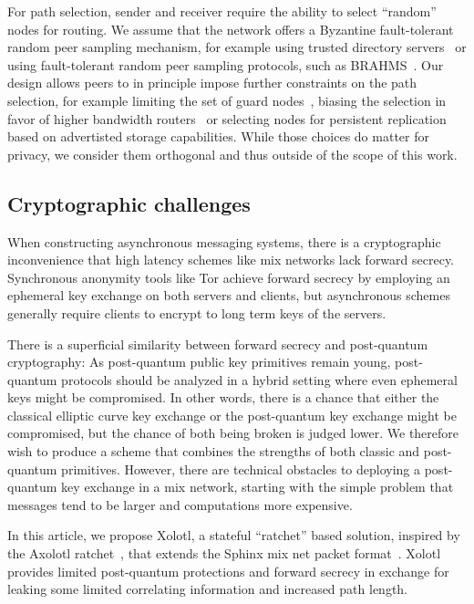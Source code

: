 \documentclass[twoside,letterpaper]{llncs}
\begin{document}
For path selection, sender and receiver require the ability to select
``random'' nodes for routing.  We assume that the network offers a
Byzantine fault-tolerant random peer sampling mechanism, for example
using trusted directory servers~\cite{tordir} or using fault-tolerant
random peer sampling protocols, such as BRAHMS~\cite{brahms}.  Our
design allows peers to in principle impose further constraints on the
path selection, for example limiting the set of guard
nodes~\cite{oneguardisenough}, biasing the selection in favor of
higher bandwidth routers~\cite{findexample} or selecting nodes for
persistent replication based on advertisted storage capabilities.
While those choices do matter for privacy, we consider them orthogonal
and thus outside of the scope of this work.

\subsection{Cryptographic challenges}

When constructing asynchronous messaging systems, there is a
cryptographic inconvenience that high latency schemes like mix
networks lack forward secrecy.  Synchronous anonymity tools like Tor
achieve forward secrecy by employing an ephemeral key exchange on both
servers and clients, but asynchronous schemes generally require
clients to encrypt to long term keys of the servers.

There is a superficial similarity between forward secrecy and
post-quantum cryptography: As post-quantum public key primitives
remain young, post-quantum protocols should be analyzed in a hybrid
setting where even ephemeral keys might be compromised.  In other
words, there is a chance that either the classical elliptic curve key
exchange or the post-quantum key exchange might be compromised, but
the chance of both being broken is judged lower.  We therefore wish
to produce a scheme that combines the strengths of both classic and
post-quantum primitives.  However, there are technical obstacles to
deploying a post-quantum key exchange in a mix network, starting with
the simple problem that messages tend to be larger
and computations more expensive.

In this article, we propose Xolotl, a stateful ``ratchet'' based
solution, inspired by the Axolotl ratchet~\cite{TextSecure}, that
extends the Sphinx mix net packet format~\cite{Sphinx}.  
Xolotl provides limited post-quantum protections and forward secrecy
in exchange for leaking some limited correlating information and
increased path length.  
\end{document}
